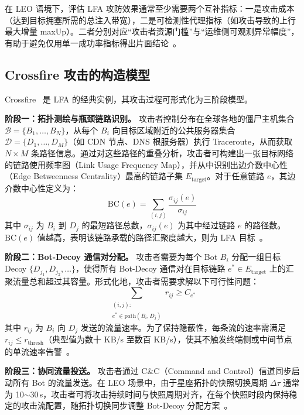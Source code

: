 在 LEO 语境下，评估 LFA 攻防效果通常至少需要两个互补指标：一是攻击成本（达到目标拥塞所需的总注入带宽），二是可检测性代理指标（如攻击导致的上行最大增量 maxUp）。二者分别对应“攻击者资源门槛”与“运维侧可观测异常幅度”，有助于避免仅用单一成功率指标得出片面结论~\cite{icarus}。

\subsection{Crossfire 攻击的构造模型}

Crossfire~\cite{crossfire} 是 LFA 的经典实例，其攻击过程可形式化为三阶段模型。

\textbf{阶段一：拓扑测绘与瓶颈链路识别。} 攻击者控制分布在全球各地的僵尸主机集合 $\mathcal{B} = \{B_1, \ldots, B_N\}$，从每个 $B_i$ 向目标区域附近的公共服务器集合 $\mathcal{D} = \{D_1, \ldots, D_M\}$（如 CDN 节点、DNS 根服务器）执行 Traceroute，从而获取 $N \times M$ 条路径信息。通过对这些路径的重叠分析，攻击者可构建出一张目标网络的链路使用频率图（Link Usage Frequency Map），并从中识别出边介数中心性（Edge Betweenness Centrality）最高的链路子集 $E_{\text{target}}$。对于任意链路 $e$，其边介数中心性定义为：
\begin{equation}
    \text{BC}(e) = \sum_{(i,j)} \frac{\sigma_{ij}(e)}{\sigma_{ij}}
\end{equation}
其中 $\sigma_{ij}$ 为 $B_i$ 到 $D_j$ 的最短路径总数，$\sigma_{ij}(e)$ 为其中经过链路 $e$ 的路径数。$\text{BC}(e)$ 值越高，表明该链路承载的路径汇聚度越大，则为 LFA 目标~\cite{crossfire}。

\textbf{阶段二：Bot-Decoy 通信对分配。} 攻击者需要为每个 Bot $B_i$ 分配一组目标 Decoy $\{D_{j_1}, D_{j_2}, \ldots\}$，使得所有 Bot-Decoy 通信对在目标链路 $e^* \in E_{\text{target}}$ 上的汇聚流量总和超过其容量。形式化地，攻击者需要求解以下可行性问题：
\begin{equation}
    \sum_{\substack{(i,j): \\ e^* \in \text{path}(B_i, D_j)}} r_{ij} \geq C_{e^*}
\end{equation}
其中 $r_{ij}$ 为 $B_i$ 向 $D_j$ 发送的流量速率。为了保持隐蔽性，每条流的速率需满足 $r_{ij} \leq r_{\text{thresh}}$（典型值为数十 KB/s 至数百 KB/s），使其不触发终端侧或中间节点的单流速率告警~\cite{crossfire}。

\textbf{阶段三：协同流量投送。} 攻击者通过 C\&C（Command and Control）信道同步启动所有 Bot 的流量发送。在 LEO 场景中，由于星座拓扑的快照切换周期 $\Delta\tau$ 通常为 10$\sim$30\,s，攻击者可将攻击持续时间与快照周期对齐，在每个快照时段内保持稳定的攻击流配置，随拓扑切换同步调整 Bot-Decoy 分配方案~\cite{crossfire, icarus}。

